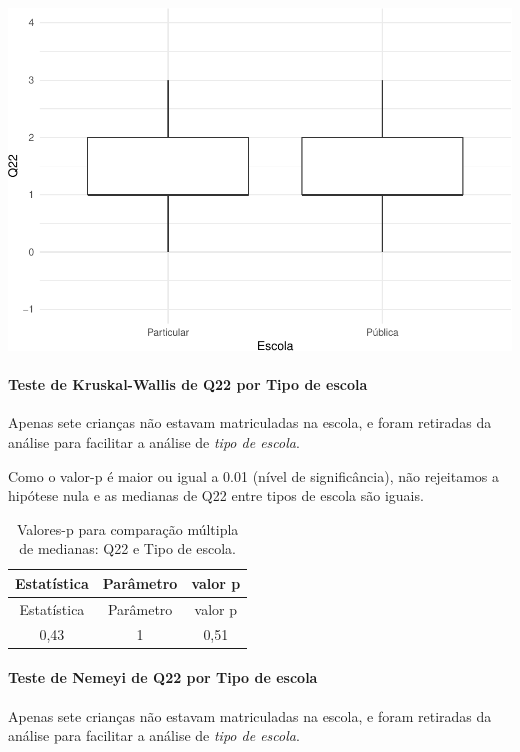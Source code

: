 \documentclass[]{article}
\let\oldparagraph\paragraph
\renewcommand{\paragraph}[1]{\oldparagraph{#1}\mbox{}}
\begin{document}
\begin{center}\includegraphics[width=0.75\linewidth]{relatorio_covid19_files/figure-latex/unnamed-chunk-530-1} \end{center}

\hypertarget{teste-de-kruskal-wallis-de-q22-por-tipo-de-escola}{%
\paragraph{Teste de Kruskal-Wallis de Q22 por Tipo de escola}\label{teste-de-kruskal-wallis-de-q22-por-tipo-de-escola}}

Apenas sete crianças não estavam matriculadas na escola, e foram retiradas da análise para facilitar a análise de \emph{tipo de escola}.

Como o valor-p é maior ou igual a 0.01 (nível de significância), não rejeitamos a hipótese nula e as medianas de Q22 entre tipos de escola são iguais.

\begin{longtable}[]{@{}ccc@{}}
\caption{\label{tab:unnamed-chunk-532}Valores-p para comparação múltipla de medianas: Q22 e Tipo de escola.}\tabularnewline
\toprule
Estatística & Parâmetro & valor p\tabularnewline
\midrule
\endfirsthead
\toprule
Estatística & Parâmetro & valor p\tabularnewline
\midrule
\endhead
0,43 & 1 & 0,51\tabularnewline
\bottomrule
\end{longtable}

\hypertarget{teste-de-nemeyi-de-q22-por-tipo-de-escola}{%
\paragraph{Teste de Nemeyi de Q22 por Tipo de escola}\label{teste-de-nemeyi-de-q22-por-tipo-de-escola}}

Apenas sete crianças não estavam matriculadas na escola, e foram retiradas da análise para facilitar a análise de \emph{tipo de escola}.
\end{document}
